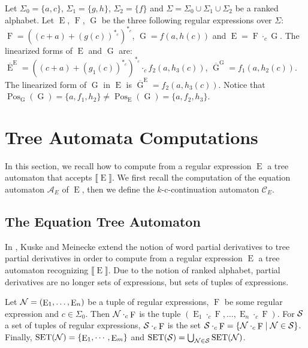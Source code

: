 \documentclass{llncs}
\def\Po#1#2{\Pos_{#1}{(#2)}}
\DeclareMathOperator{\E}{E}
\DeclareMathOperator{\f}{F}
\DeclareMathOperator{\G}{G}
\DeclareMathOperator{\Pos}{Pos}
\def\b#1{\overline{#1}}
\begin{document}
\begin{example}\label{exp}
Let $\Sigma_0=\{a,c\}$,   $\Sigma_1=\{g,h\}$, $\Sigma_2=\{f\}$ and $\Sigma=\Sigma_0\cup\Sigma_1\cup\Sigma_2$ be a ranked alphabet.  Let $\E$, $\f$, $\G$ be the three following regular expressions over $\Sigma$: $\f=((c + a)+(g(c))^{*_ c})^{*_c}$, $\G=f(a,h(c))$  and $\E=\f\cdot_c \G$. The linearized forms of $\E$ and $\G$ are: $\b{\E}^{\E}=((c + a)+(g_1(c))^{*_{c}})^{*_{c}}\cdot_{c} f_2(a, h_3(c))$, $\b{\G}^{\G}=f_1(a,h_2(c))$. The linearized form of $\G$ in $\E$ is $\b{\G}^{\E}=f_2(a,h_3(c))$. Notice that $\Po{\G}{\G}=\lbrace a,f_1, h_2\rbrace\neq \Po{\E}{\G}=\lbrace a, f_2, h_3 \rbrace$.
\end{example}

\section{Tree Automata Computations}\label{sec tree automata}

In this section, we recall how to compute from a regular expression $\E$ a tree automaton that accepts $\llbracket \E\rrbracket$. We first recall the computation of the equation automaton $\mathcal{A}_E$ of $\E$, then we define the $k$-c-continuation automaton $\mathcal{C}_E$.

\subsection{The Equation Tree Automaton}

  In \cite{automate2}, Kuske and Meinecke extend the notion of word partial derivatives \cite{antimirov} to tree partial derivatives in order to compute from a regular expression $\E$ a tree automaton recognizing $\llbracket \E\rrbracket$. Due to the notion of  ranked alphabet, partial derivatives are no longer sets of expressions, but sets of tuples of expressions.
  
Let ${\cal N}=(\E_1,\ldots,\E_n)$ be a tuple of regular expressions, $\f$ be some regular expression and $c\in\Sigma_0$. Then ${\cal N}\cdot_c\f$ is the tuple $(\E_1\cdot_c\f,\dots,\E_n\cdot_c\f)$. For ${\cal S}$ a set of tuples of regular expressions, ${\cal S}\cdot_c \f$ is the set ${\cal S}\cdot_c \f=\{{\cal N}\cdot_c\f\mid {\cal N}\in {\cal S}\}$. Finally, $\mathrm{SET}({\cal N})=\{\E_1, \cdots,\E_m\}$ and $\mathrm{SET}({\cal S})=\bigcup_{{\cal N}\in{\cal S}}\mathrm{SET}({\cal N})$.
\end{document}

